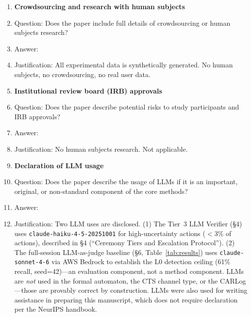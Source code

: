 \begin{enumerate}
\item {\bf Crowdsourcing and research with human subjects}
    \item[] Question: Does the paper include full details of crowdsourcing or human subjects research?
    \item[] Answer: \answerNA{}
    \item[] Justification: All experimental data is synthetically generated. No human subjects, no crowdsourcing, no real user data.

\item {\bf Institutional review board (IRB) approvals}
    \item[] Question: Does the paper describe potential risks to study participants and IRB approvals?
    \item[] Answer: \answerNA{}
    \item[] Justification: No human subjects research. Not applicable.

\item {\bf Declaration of LLM usage}
    \item[] Question: Does the paper describe the usage of LLMs if it is an important, original, or non-standard component of the core methods?
    \item[] Answer: \answerYes{}
    \item[] Justification: Two LLM uses are disclosed. (1) The Tier~3 LLM Verifier (\S4) uses \texttt{claude-haiku-4-5-20251001} for high-uncertainty actions ($<3\%$ of actions), described in \S4 (``Ceremony Tiers and Escalation Protocol''). (2) The full-session LLM-as-judge baseline (\S6, Table~\ref{tab:results}) uses \texttt{claude-sonnet-4-6} via AWS Bedrock to establish the L0 detection ceiling (61\% recall, seed=42)---an evaluation component, not a method component. LLMs are \emph{not} used in the formal automaton, the CTS channel type, or the CARLog---those are provably correct by construction. LLMs were also used for writing assistance in preparing this manuscript, which does not require declaration per the NeurIPS handbook.

\end{enumerate}
